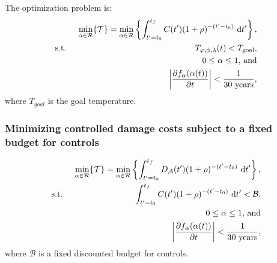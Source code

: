 \documentclass{article}
\begin{document}
The optimization problem is:
\begin{align}
    & & \min_{\alpha \in \mathcal{R}} \{ \mathcal{T} \} = \min_{\alpha \in \mathcal{R}} \left\{
    \int_{t'=t_{0}}^{t_{f}}
    C(t') (1 + \rho)^{-(t'-t_{0})} \text{ d}t' \right\},
    \\
    & \text{s.t. }
    & T_{\varphi, \phi, \lambda}(t) < T_{\text{goal}},\\
    && 0 \leq \alpha \leq 1\text{, and}\\
    &&\abs{\pdv{f_{\alpha}(\alpha(t))}{t}} < \frac{1}{30\text{ years}},
\end{align}
where $T_{goal}$ is the goal temperature.

\subsubsection{Minimizing controlled damage costs subject to a fixed budget for controls}

\begin{align}
    & & \min_{\alpha \in \mathcal{R}} \{ \mathcal{T} \} = \min_{\alpha \in \mathcal{R}} \left\{
    \int_{t'=t_{0}}^{t_{f}}
    D_{\mathcal{A}}(t') (1 + \rho)^{-(t'-t_{0})} \text{ d}t' \right\},\\
    & \text{s.t. }
    & \int_{t'=t_{0}}^{t_{f}}
    C(t') (1 + \rho)^{-(t'-t_{0})} \text{ d}t' < \mathcal{B},\\
    &&0 \leq \alpha \leq 1\text{, and}\\
    &&\abs{\pdv{f_{\alpha}(\alpha(t))}{t}} < \frac{1}{30\text{ years}},
\end{align}
where $\mathcal{B}$ is a fixed discounted budget for controls.

%
%
\end{document}
